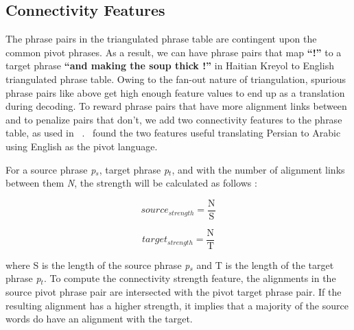 \documentclass[11pt]{article}
\begin{document}

\subsection{Connectivity Features}
\label{sec:strength}

	
	The phrase pairs in the triangulated phrase table are contingent upon the common pivot phrases. As a result, we can have phrase pairs that map \textbf{``!''} to a target phrase \textbf{``and making the soup thick !''} in Haitian Kreyol to English triangulated phrase table. Owing to the fan-out nature of triangulation, spurious phrase pairs like above get high enough feature values to end up as a translation during decoding. To reward phrase pairs that have more alignment links between and to penalize pairs that don't, we add two connectivity features to the phrase table, as used in ~\cite{Ahmed:13}.~ found the two features useful translating Persian to Arabic using English as the pivot language. 

	For a source phrase \emph{p$_s$}, target phrase \emph{p$_t$}, and with the number of alignment links between them \emph{N}, the strength will be calculated as follows :

	\begin{equation*}
		source_{strength} = \frac{\mathrm{N}}{\mathrm{S}}
	\end{equation*}

	\begin{equation*}
		target_{strength} = \frac{\mathrm{N}}{\mathrm{T}}
	\end{equation*}

	where S is the length of the source phrase \emph{p$_s$} and T is the length of the target phrase \emph{p$_t$}. To compute the connectivity strength feature, the alignments in the source pivot phrase pair are intersected with the pivot target phrase pair. If the resulting alignment has a higher strength, it implies that a majority of the source words do have an alignment with the target.
\end{document}
